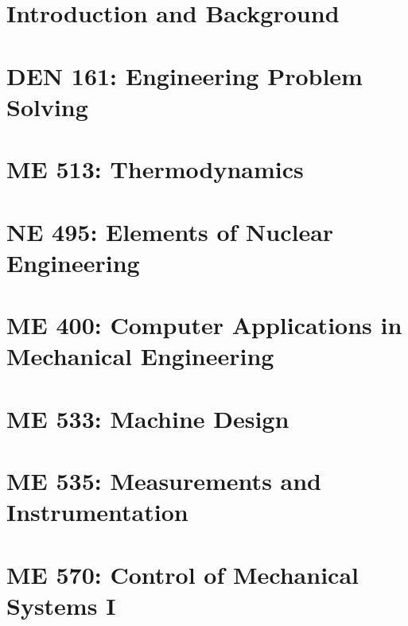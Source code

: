 \documentclass[12pt]{report}
\begin{document}
    

    
    
    

    \tableofcontents

    \listoffigures

    \listoftables
    
    \chapter{Introduction and Background}
    
    
    \chapter{DEN 161: Engineering Problem Solving}
    
    
    \chapter{ME 513: Thermodynamics}
    

    \chapter{NE 495: Elements of Nuclear Engineering}
    
    
    \chapter{ME 400: Computer Applications in Mechanical Engineering}
    
    
    \chapter{ME 533: Machine Design}
    

    \chapter{ME 535: Measurements and Instrumentation}
    

    \chapter{ME 570: Control of Mechanical Systems I}
    
\end{document}
